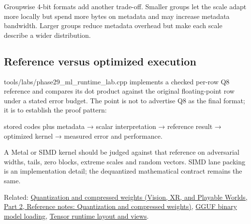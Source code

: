 Groupwise 4-bit formats add another trade-off. Smaller groups let the scale adapt more locally but spend more bytes on metadata and may increase metadata bandwidth. Larger groups reduce metadata overhead but make each scale describe a wider distribution.

\subsection{Reference versus optimized execution}\label{appendix-241c0e42ac2d-reference-versus-optimized-execution}

\hypertarget{appendix-241c0e42ac2d-reference-versus-optimized-execution}{}

tools/labs/phase29\_ml\_runtime\_lab.cpp implements a checked per-row Q8 reference and compares its dot product against the original floating-point row under a stated error budget. The point is not to advertise Q8 as the final format; it is to establish the proof pattern:

stored codes plus metadata → scalar interpretation → reference result → optimized kernel → measured error and performance.

A Metal or SIMD kernel should be judged against that reference on adversarial widths, tails, zero blocks, extreme scales and random vectors. SIMD lane packing is an implementation detail; the dequantized mathematical contract remains the same.

Related: \href{../07-Vision-XR-and-Playable-Worlds-P02/main.pdf\#appendix-fdc7879e8bf2}{Quantization and compressed weights (Vision, XR, and Playable Worlds, Part 2, Reference notes: Quantization and compressed weights)}, \hyperref[appendix-fef72dd246f2]{GGUF binary model loading}, \hyperref[appendix-cebadf3106d1]{Tensor runtime layout and views}.

